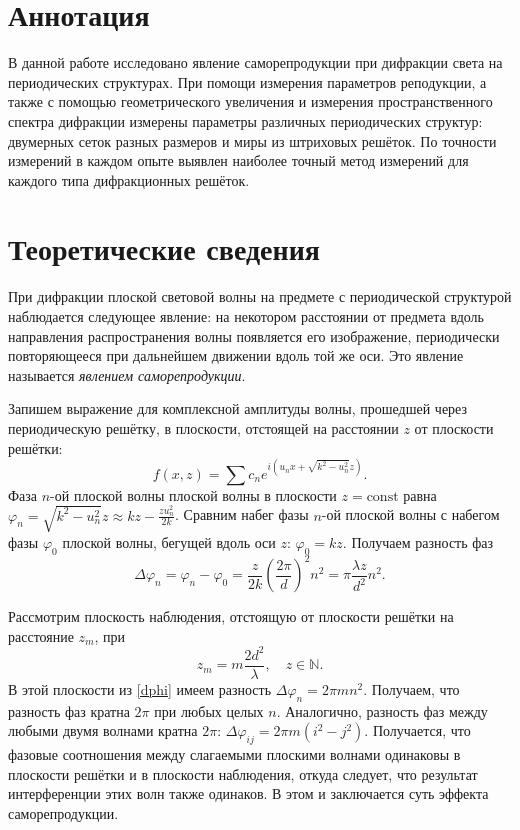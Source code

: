 \section{Аннотация}
В данной работе исследовано явление саморепродукции при дифракции света на периодических структурах. При помощи измерения параметров реподукции, а также с помощью геометрического увеличения и измерения пространственного спектра дифракции измерены параметры различных периодических структур: двумерных сеток разных размеров и миры из штриховых решёток. По точности измерений в каждом опыте выявлен наиболее точный метод измерений для каждого типа дифракционных решёток.

\section{Теоретические сведения}
При дифракции плоской световой волны на предмете с периодической структурой наблюдается следующее явление: на некотором расстоянии от предмета вдоль направления распространения волны появляется его изображение, периодически повторяющееся при дальнейшем движении вдоль той же оси. Это явление называется \textit{явлением саморепродукции}.

Запишем выражение для комплексной амплитуды волны, прошедшей через периодическую решётку, в плоскости, отстоящей на расстоянии $z$ от плоскости решётки:
\begin{equation*}
    f(x, z) = \sum c_ne^{i(u_nx + \sqrt{k^2-u_n^2}z)}.
\end{equation*}
Фаза $n$-ой плоской волны плоской волны в плоскости $z = \text{const}$ равна $\varphi_n = \sqrt{k^2 - u_n^2}z\approx kz - \frac{zu_n^2}{2k}$. Сравним набег фазы $n$-ой плоской волны с набегом фазы $\varphi_0$ плоской волны, бегущей вдоль оси $z$: $\varphi_0 = kz$. Получаем разность фаз
\begin{equation}\label{dphi}
    \Delta\varphi_n = \varphi_n - \varphi_0 = \frac{z}{2k}\left(\frac{2\pi}{d}\right)^2n^2 = \pi\frac{\lambda z}{d^2}n^2.
\end{equation}

Рассмотрим плоскость наблюдения, отстоящую от плоскости решётки на расстояние $z_m$, при 
\begin{equation}\label{ZZZ}
    z_m = m\frac{2d^2}{\lambda},\quad z\in\mathbb{N}.
\end{equation}
В этой плоскости из \eqref{dphi} имеем разность $\Delta\varphi_n = 2\pi m n^2$. Получаем, что разность фаз кратна $2\pi$ при любых целых $n$. Аналогично, разность фаз между любыми двумя волнами кратна $2\pi$: $\Delta\varphi_{ij} = 2\pi m(i^2-j^2)$. Получается, что фазовые соотношения между слагаемыми плоскими волнами одинаковы в плоскости решётки и в плоскости наблюдения, откуда следует, что результат интерференции этих волн также одинаков. В этом и заключается суть эффекта саморепродукции.

